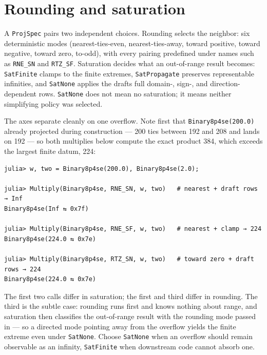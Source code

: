 \section{Rounding and saturation}



\label{4169779663468363235}{}


A \texttt{ProjSpec} pairs two independent choices. Rounding selects the neighbor: six deterministic modes (nearest-ties-even, nearest-ties-away, toward positive, toward negative, toward zero, to-odd), with every pairing predefined under names such as \texttt{RNE\_\allowbreak{}SN} and \texttt{RTZ\_\allowbreak{}SF}. Saturation decides what an out-of-range result becomes: \texttt{SatFinite} clamps to the finite extremes, \texttt{SatPropagate} preserves representable infinities, and \texttt{SatNone} applies the draft{\textquotesingle}s full domain-, sign-, and direction-dependent rows. \texttt{SatNone} does not mean {\textquotedbl}no saturation{\textquotedbl}; it means neither simplifying policy was selected.



The axes separate cleanly on one overflow. Note first that \texttt{Binary8p4se(200.0)} already projected during construction — 200 ties between 192 and 208 and lands on 192 — so both multiplies below compute the exact product 384, which exceeds the largest finite datum, 224:




\nopagebreak[4]
\begin{verbatim}
julia> w, two = Binary8p4se(200.0), Binary8p4se(2.0);

julia> Multiply(Binary8p4se, RNE_SN, w, two)   # nearest + draft rows → Inf
Binary8p4se(Inf ⇆ 0x7f)

julia> Multiply(Binary8p4se, RNE_SF, w, two)   # nearest + clamp → 224
Binary8p4se(224.0 ⇆ 0x7e)

julia> Multiply(Binary8p4se, RTZ_SN, w, two)   # toward zero + draft rows → 224
Binary8p4se(224.0 ⇆ 0x7e)
\end{verbatim}



The first two calls differ in saturation; the first and third differ in rounding. The third is the subtle case: rounding runs first and knows nothing about range, and saturation then classifies the out-of-range result with the rounding mode passed in — so a directed mode pointing away from the overflow yields the finite extreme even under \texttt{SatNone}. Choose \texttt{SatNone} when an overflow should remain observable as an infinity, \texttt{SatFinite} when downstream code cannot absorb one.



